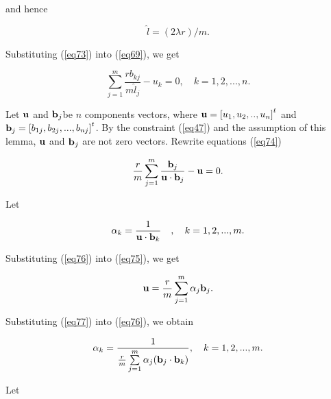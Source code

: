 \documentclass [18pt]{article}
\begin{document}
\noindent
and hence


\begin{equation}
\label{eq73}
\widehat{l} = (2\lambda r) / m.
\end{equation}



Substituting (\ref{eq73}) into (\ref{eq69}), we get


\begin{equation}
\label{eq74}
\sum\limits_{j = 1}^m {\frac{rb_{kj} }{m\widehat{l}_j }} - u_k = 0,
\quad
k = 1,2,...,n.
\end{equation}



Let ${\rm {\bf u}}$ and ${\rm {\bf b}}_j $be $n$ components vectors, where
${\rm {\bf u}} = \left[ {u_1 ,u_2 ,..,u_n } \right]^t$ and ${\rm {\bf b}}_j
= \left[ {b_{1j} ,b_{2j} ,...,b_{nj} } \right]^t$. By the constraint (\ref{eq47})
and the assumption of this lemma, ${\rm {\bf u}}$ and ${\rm {\bf b}}_j $ are
not zero vectors. Rewrite equations (\ref{eq74})


\begin{equation}
\label{eq75}
\frac{r}{m}\sum\limits_{j = 1}^m {\frac{{\rm {\bf b}}_j }{{\rm {\bf u}}
\cdot {\rm {\bf b}}_j }} - {\rm {\bf u}} = 0.
\end{equation}



Let


\begin{equation}
\label{eq76}
\alpha _k = \frac{1}{{\rm {\bf u}} \cdot {\rm {\bf b}}_k } \quad ,
\quad
k = 1,2,...,m.
\end{equation}



Substituting (\ref{eq76}) into (\ref{eq75}), we get


\begin{equation}
\label{eq77}
{\rm {\bf u}} = \frac{r}{m}\sum\limits_{j = 1}^m {\alpha _j {\rm {\bf b}}_j
} .
\end{equation}



Substituting (\ref{eq77}) into (\ref{eq76}), we obtain


\begin{equation}
\label{eq78}
\alpha _k = \frac{1}{\frac{r}{m}\sum\limits_{j = 1}^m {\alpha _j ({\rm {\bf
b}}_j \cdot {\rm {\bf b}}_k )} },
\quad
k = 1,2,...,m.
\end{equation}



Let
\end{document}
